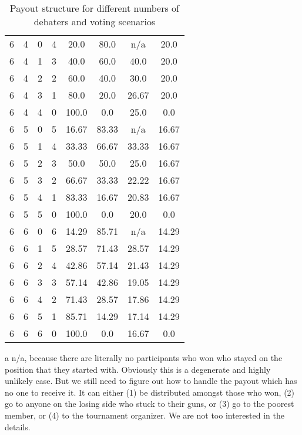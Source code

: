 \begin{table}[H]
\begin{threeparttable}
\begin{tabular}{cccccccc}
6 & 4 & 0 & 4 & 20.0 & 80.0 & n/a\tnote{a} & 20.0 \\
6 & 4 & 1 & 3 & 40.0 & 60.0 & 40.0 & 20.0 \\
6 & 4 & 2 & 2 & 60.0 & 40.0 & 30.0 & 20.0 \\
6 & 4 & 3 & 1 & 80.0 & 20.0 & 26.67 & 20.0 \\
6 & 4 & 4 & 0 & 100.0 & 0.0 & 25.0 & 0.0 \\
6 & 5 & 0 & 5 & 16.67 & 83.33 & n/a\tnote{a} & 16.67 \\
6 & 5 & 1 & 4 & 33.33 & 66.67 & 33.33 & 16.67 \\
6 & 5 & 2 & 3 & 50.0 & 50.0 & 25.0 & 16.67 \\
6 & 5 & 3 & 2 & 66.67 & 33.33 & 22.22 & 16.67 \\
6 & 5 & 4 & 1 & 83.33 & 16.67 & 20.83 & 16.67 \\
6 & 5 & 5 & 0 & 100.0 & 0.0 & 20.0 & 0.0 \\
6 & 6 & 0 & 6 & 14.29 & 85.71 & n/a\tnote{a} & 14.29 \\
6 & 6 & 1 & 5 & 28.57 & 71.43 & 28.57 & 14.29 \\
6 & 6 & 2 & 4 & 42.86 & 57.14 & 21.43 & 14.29 \\
6 & 6 & 3 & 3 & 57.14 & 42.86 & 19.05 & 14.29 \\
6 & 6 & 4 & 2 & 71.43 & 28.57 & 17.86 & 14.29 \\
6 & 6 & 5 & 1 & 85.71 & 14.29 & 17.14 & 14.29 \\
6 & 6 & 6 & 0 & 100.0 & 0.0 & 16.67 & 0.0 \\
\bottomrule
\end{tabular}
\begin{tablenotes}
    \item[a] n/a, because there are literally no participants who won who stayed on the position that they started with. 
    Obviously this is a degenerate and highly unlikely case. But we still need to figure out how to handle the payout which has no one to receive it. It can either (1) be distributed amongst those who won, (2) go to anyone on the losing side who stuck to their guns, or (3) go to the poorest member, or (4) to the tournament organizer. We are not too interested in the details. 
\end{tablenotes}
\end{threeparttable}

\caption{Payout structure for different numbers of debaters and voting scenarios}
\end{table}

